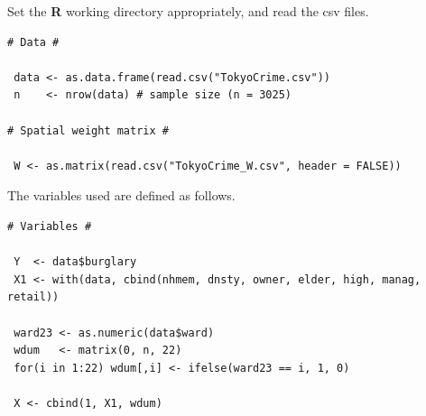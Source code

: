 \documentclass[10.5pt, A4paper, openany, uplatex]{book}
\numberwithin{equation}{section}
\begin{document}
Set the \textbf{R} working directory appropriately, and read the csv files.
\begin{lstlisting}[basicstyle=\ttfamily\footnotesize, frame=single]
# Data #

 data <- as.data.frame(read.csv("TokyoCrime.csv"))
 n    <- nrow(data) # sample size (n = 3025)

# Spatial weight matrix #

 W <- as.matrix(read.csv("TokyoCrime_W.csv", header = FALSE))
\end{lstlisting}
The variables used are defined as follows.
\begin{lstlisting}[basicstyle=\ttfamily\footnotesize, frame=single]
# Variables #

 Y  <- data$burglary
 X1 <- with(data, cbind(nhmem, dnsty, owner, elder, high, manag, retail))

 ward23 <- as.numeric(data$ward)
 wdum   <- matrix(0, n, 22)
 for(i in 1:22) wdum[,i] <- ifelse(ward23 == i, 1, 0)

 X <- cbind(1, X1, wdum)
\end{lstlisting}
\end{document}
